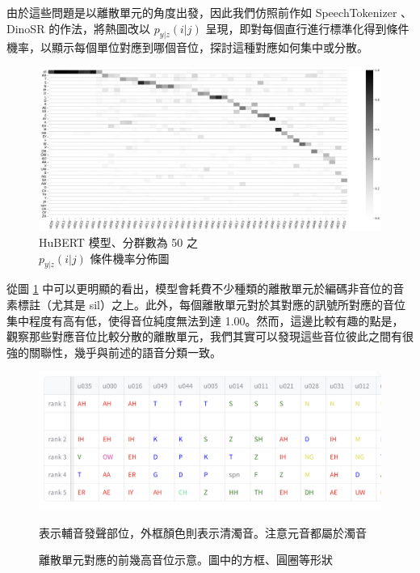 {        由於這些問題是以離散單元的角度出發，因此我們仿照前作如 SpeechTokenizer \cite{zhang2024speechtokenizer}、DinoSR \cite{liu2024dinosr} 的作法，將熱圖改以 $p_{y|z}(i|j)$ 呈現，即對每個直行進行標準化得到條件機率，以顯示每個單位對應到哪個音位，探討這種對應如何集中或分散。

\begin{figure}
    \centering
    \includegraphics[width=1\linewidth]{figures/11111111.png}
    \caption{HuBERT 模型、分群數為 50 之\\
$p_{y|z}(i|j)$  條件機率分佈圖}
    \label{fig:hubert-50-givenunit-byprob}
\end{figure}
        從圖 \ref{fig:hubert-50-givenunit-byprob} 中可以更明顯的看出，模型會耗費不少種類的離散單元於編碼非音位的音素標註（尤其是 sil）之上。此外，每個離散單元對於其對應的訊號所對應的音位集中程度有高有低，使得音位純度無法到達 1.00。然而，這邊比較有趣的點是，觀察那些對應音位比較分散的離散單元，我們其實可以發現這些音位彼此之間有很強的關聯性，幾乎與前述的語音分類一致。  %

        \begin{figure}
            \centering
            \includegraphics[width=1\linewidth]{figures/unit_rank_phn.png}  %
            \caption[]{
離散單元對應的前幾高音位示意。圖中的方框、圓圈等形狀}
                                          表示輔音發聲部位，外框顏色則表示清濁音。注意元音都屬於濁音
            \label{fig:unit-to-phn-rankings}
        \end{figure}
        
}
